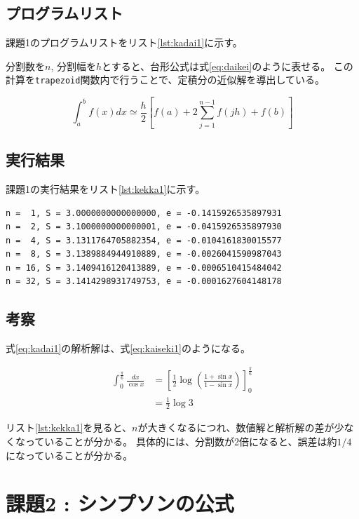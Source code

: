 \documentclass[a4j,titlepage]{jsarticle}
\begin{document}
\subsection{プログラムリスト}
課題1のプログラムリストをリスト\ref{lst:kadai1}に示す。

分割数を$n$, 分割幅を$h$とすると、台形公式は式\ref{eq:daikei}のように表せる。
この計算を\texttt{trapezoid}関数内で行うことで、定積分の近似解を導出している。

\begin{equation}
  \int_a^b f(x) dx \simeq \frac{h}{2} \left[ f(a) + 2 \sum_{j=1}^{n-1} f(jh) + f(b) \right]
  \label{eq:daikei}
\end{equation}



\subsection{実行結果}
課題1の実行結果をリスト\ref{lst:kekka1}に示す。

\begin{lstlisting}[style=text,caption=課題1の実行結果,label=lst:kekka1]
n =  1, S = 3.0000000000000000, e = -0.1415926535897931
n =  2, S = 3.1000000000000001, e = -0.0415926535897930
n =  4, S = 3.1311764705882354, e = -0.0104161830015577
n =  8, S = 3.1389884944910889, e = -0.0026041590987043
n = 16, S = 3.1409416120413889, e = -0.0006510415484042
n = 32, S = 3.1414298931749753, e = -0.0001627604148178
\end{lstlisting}

\subsection{考察}
式\ref{eq:kadai1}の解析解は、式\ref{eq:kaiseki1}のようになる。

\begin{align}
  \int_0^\frac{\pi}{6} \frac{dx}{\cos x} &= \left[ \frac{1}{2} \log \left( \frac{1 + \sin x}{1 - \sin x} \right) \right]_0^\frac{\pi}{6} \nonumber \\
  &= \frac{1}{2} \log 3
  \label{eq:kaiseki1}
\end{align}

リスト\ref{lst:kekka1}を見ると、$n$が大きくなるにつれ、数値解と解析解の差が少なくなっていることが分かる。
具体的には、分割数が2倍になると、誤差は約$1/4$になっていることが分かる。


\section{課題2 : シンプソンの公式}
\end{document}
